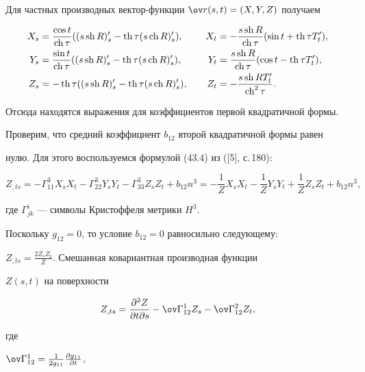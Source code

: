 \begin{pf}


Для частных производных вектор-функции $\ov r(s,t)=(X,Y,Z)$ получаем


\begin{alignat*}{2}


X_s&=\frac{\cos t}{\ch \tau}((s\sh R)_s'-\th \tau (s \ch R)_s'),


&\quad X_t&=-\frac{s\sh R}{\ch \tau}(\sin t+\th \tau T_t'),\\


Y_s&=\frac{\sin t}{\ch \tau}((s\sh R)_s'-\th \tau (s\ch R)_s'),


&\quad Y_t&=\frac{s\sh R}{\ch \tau}(\cos t-\th \tau T_t'),\\


Z_s&=-\th \tau ((s\sh R)_s'-\th \tau (s\ch R)_s'),


&\quad Z_t&=-\frac{s\sh RT_t'}{\ch^2\tau}.


\end{alignat*}


Отсюда находятся выражения для коэффициентов первой квадратичной формы.


Проверим, что средний коэффициент $b_{12}$ второй квадратичной формы равен


нулю. Для этого воспользуемся формулой (43.4) из ([5], с.\,180):


$$


Z_{,ts}=-\Gamma^3_{11}X_sX_t-\Gamma^3_{22}Y_sY_t-


\Gamma^3_{33}Z_sZ_t+b_{12}n^3=


-\frac{1}{Z}X_sX_t-\frac{1}{Z}Y_sY_t+\frac{1}{Z}Z_sZ_t+b_{12}n^3,


$$


где $\Gamma^i_{jk}$ --- символы Кристоффеля метрики $H^3$.


Поскольку $g_{12}=0$, то условие $b_{12}=0$ равносильно следующему:


$Z_{,ts}=\frac{2Z_sZ_t}{Z}$. Смешанная ковариантная производная функции


$Z(s,t)$ на поверхности


$$


Z_{,ts}=\frac{\partial^2Z}{\partial t\partial s}-


\ov \Gamma^1_{12}Z_s-\ov \Gamma^2_{12}Z_t,


$$


где


$\ov \Gamma^1_{12}=\frac{1}{2g_{11}}\frac{\partial g_{11}}{\partial t}$,



\end{pf}
